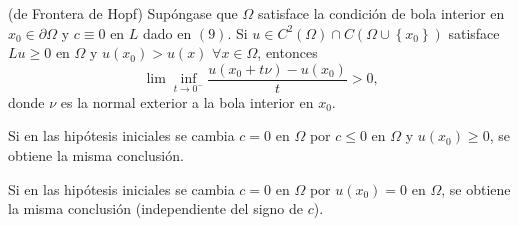 



\begin{lemma}
(de Frontera de Hopf) Sup\'{o}ngase que $\Omega$ satisface la condici\'{o}n de
bola interior en $x_{0}\in\partial\Omega$ y $c\equiv0$ en $L$ dado en $\left(
9\right)  $. Si $u\in C^{2}\left(  \Omega\right)  \cap C\left(  \Omega
\cup\left\{  x_{0}\right\}  \right)  $ satisface $Lu\geq0$ en $\Omega$ y
$u\left(  x_{0}\right)  >u\left(  x\right)  $ $\forall x\in\Omega$, entonces
\[
\lim\inf_{t\rightarrow0^{-}}\frac{u\left(  x_{0}+t\nu\right)  -u\left(
x_{0}\right)  }{t}>0\text{,}%
\]
donde $\nu$ es la normal exterior a la bola interior en $x_{0}.$

Si en las hip\'{o}tesis iniciales se cambia $c=0$ en $\Omega$ por $c\leq0$ en
$\Omega$ y $u\left(  x_{0}\right)  \geq0$, se obtiene la misma conclusi\'{o}n.

Si en las hip\'{o}tesis iniciales se cambia $c=0$ en $\Omega$ por $u\left(
x_{0}\right)  =0$ en $\Omega$, se obtiene la misma conclusi\'{o}n
(independiente del signo de $c$).
\end{lemma}
